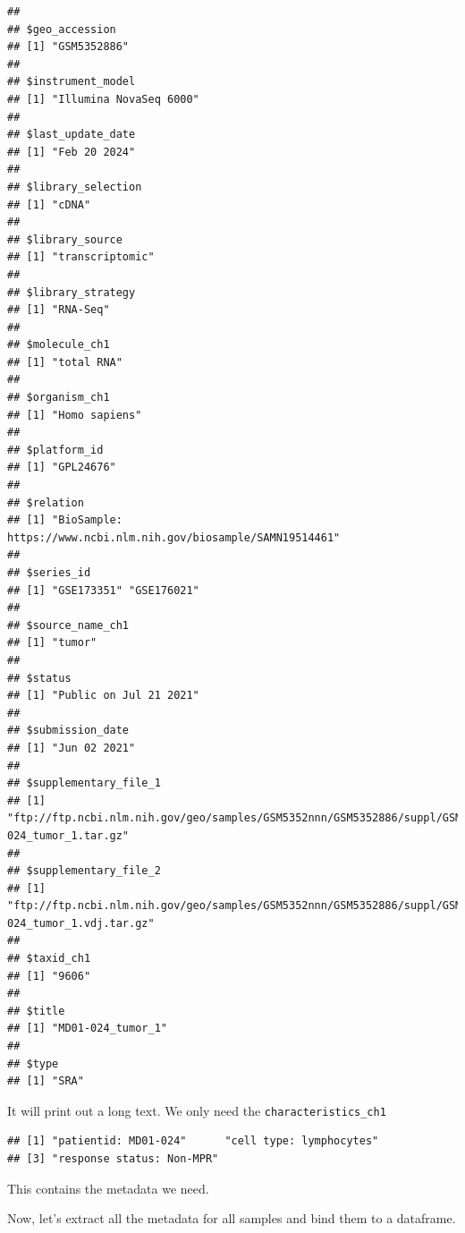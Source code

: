 \documentclass[
]{book}
\newenvironment{Shaded}{\begin{snugshade}}{\end{snugshade}}
\newcommand{\ControlFlowTok}[1]{\textcolor[rgb]{0.13,0.29,0.53}{\textbf{#1}}}
\newcommand{\DecValTok}[1]{\textcolor[rgb]{0.00,0.00,0.81}{#1}}
\newcommand{\FunctionTok}[1]{\textcolor[rgb]{0.13,0.29,0.53}{\textbf{#1}}}
\newcommand{\NormalTok}[1]{#1}
\newcommand{\OtherTok}[1]{\textcolor[rgb]{0.56,0.35,0.01}{#1}}
\newcommand{\SpecialCharTok}[1]{\textcolor[rgb]{0.81,0.36,0.00}{\textbf{#1}}}
\begin{document}
\begin{verbatim}
## 
## $geo_accession
## [1] "GSM5352886"
## 
## $instrument_model
## [1] "Illumina NovaSeq 6000"
## 
## $last_update_date
## [1] "Feb 20 2024"
## 
## $library_selection
## [1] "cDNA"
## 
## $library_source
## [1] "transcriptomic"
## 
## $library_strategy
## [1] "RNA-Seq"
## 
## $molecule_ch1
## [1] "total RNA"
## 
## $organism_ch1
## [1] "Homo sapiens"
## 
## $platform_id
## [1] "GPL24676"
## 
## $relation
## [1] "BioSample: https://www.ncbi.nlm.nih.gov/biosample/SAMN19514461"
## 
## $series_id
## [1] "GSE173351" "GSE176021"
## 
## $source_name_ch1
## [1] "tumor"
## 
## $status
## [1] "Public on Jul 21 2021"
## 
## $submission_date
## [1] "Jun 02 2021"
## 
## $supplementary_file_1
## [1] "ftp://ftp.ncbi.nlm.nih.gov/geo/samples/GSM5352nnn/GSM5352886/suppl/GSM5352886_MD01-024_tumor_1.tar.gz"
## 
## $supplementary_file_2
## [1] "ftp://ftp.ncbi.nlm.nih.gov/geo/samples/GSM5352nnn/GSM5352886/suppl/GSM5352886_MD01-024_tumor_1.vdj.tar.gz"
## 
## $taxid_ch1
## [1] "9606"
## 
## $title
## [1] "MD01-024_tumor_1"
## 
## $type
## [1] "SRA"
\end{verbatim}

It will print out a long text. We only need the \texttt{characteristics\_ch1}

\begin{Shaded}
\end{Shaded}

\begin{verbatim}
## [1] "patientid: MD01-024"      "cell type: lymphocytes"  
## [3] "response status: Non-MPR"
\end{verbatim}

This contains the metadata we need.

Now, let's extract all the metadata for all samples and bind them to a dataframe.

\begin{Shaded}
\end{Shaded}
\end{document}
